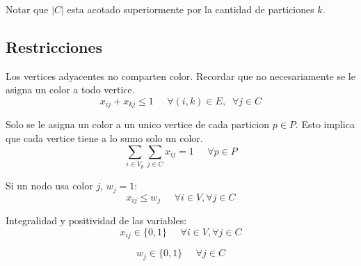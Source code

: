 Notar que $|C|$ esta acotado superiormente por la cantidad de particiones $k$.

\vspace{10px}

\subsection{Restricciones}

Los vertices adyacentes no comparten color. Recordar que no necesariamente se le asigna un color a todo vertice.
\begin{equation}
x_{ij} + x_{kj} \leq 1 \;\;\;\;\; \forall (i,k) \in E,\;\; \forall j \in C
\end{equation}

Solo se le asigna un color a un unico vertice de cada particion $p \in P$. Esto implica que cada vertice tiene a lo sumo solo un color.
\begin{equation}
\sum_{i \in V_p} \sum_{j \in C} x_{ij} = 1 \;\;\;\;\; \forall p \in P
\end{equation}

Si un nodo usa color $j$, $w_j = 1$:
\begin{equation}
x_{ij} \leq w_j \;\;\;\;\; \forall i \in V, \forall j \in C
\end{equation}

Integralidad y positividad de las variables:
\begin{equation}
x_{ij} \in \{0,1\} \;\;\;\;\; \forall i \in V, \forall j \in C
\end{equation}

\begin{equation}
w_j \in \{0,1\} \;\;\;\;\; \forall j \in C
\end{equation}